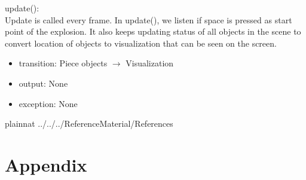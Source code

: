\documentclass[12pt, titlepage]{article}
\begin{document}
\noindent update():\\
Update is called every frame. In update(), we listen if space is pressed as start point of the explosion. It also keeps updating status of all objects in the scene to convert location of objects to visualization that can be seen on the screen.
\begin{itemize}
	\item transition: Piece objects $\rightarrow$ Visualization 
	\item output: None 
	\item exception: None  
\end{itemize}

\newpage

 {plainnat}
 {../../../ReferenceMaterial/References}

\newpage

\section{Appendix} \label{Appendix}
\end{document}
